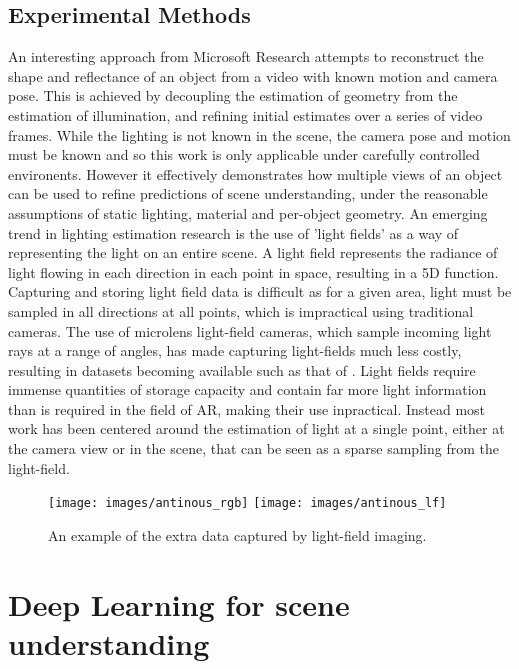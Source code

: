 \documentclass[ %
                    author={Gavin Parker},
                supervisor={Dr. Neill Campbell},
                    degree={MEng},
                     title={Deep Siamese Networks for Illumination Estimation from Stereo Images},
                  subtitle={},
                      type={research},
                      year={2018} ]{dissertation}
\begin{document}
\subsection{Experimental Methods}
An interesting approach from Microsoft Research \cite{xia} attempts to reconstruct the shape and reflectance of an object from a video with known motion and camera pose. This is achieved by decoupling the estimation of geometry from the estimation of illumination, and refining initial estimates over a series of video frames. While the lighting is not known in the scene, the camera pose and motion must be known and so this work is only applicable under carefully controlled environents. However it effectively demonstrates how multiple views of an object can be used to refine predictions of scene understanding, under the reasonable assumptions of static lighting, material and per-object geometry.
\newline
An emerging trend in lighting estimation research is the use of 'light fields' as a way of representing the light on an entire scene. A light field represents the radiance of light flowing in each direction in each point in space, resulting in a 5D function. Capturing and storing light field data is difficult as for a given area, light must be sampled in all directions at all points, which is impractical using traditional cameras. The use of microlens light-field cameras, which sample incoming light rays at a range of angles, has made capturing light-fields much less costly, resulting in datasets becoming available such as that of \cite{hazirbas17ddff}. Light fields require immense quantities of storage capacity and contain far more light information than is required in the field of AR, making their use inpractical. Instead most work has been centered around the estimation of light at a single point, either at the camera view or in the scene, that can be seen as a sparse sampling from the light-field.
\begin{figure}[H]
\texttt{[image: images/antinous\_rgb]}
\texttt{[image: images/antinous\_lf]}
\centering
\caption{An example of the extra data captured by light-field imaging.}
\end{figure}
\section{Deep Learning for scene understanding}
\end{document}
